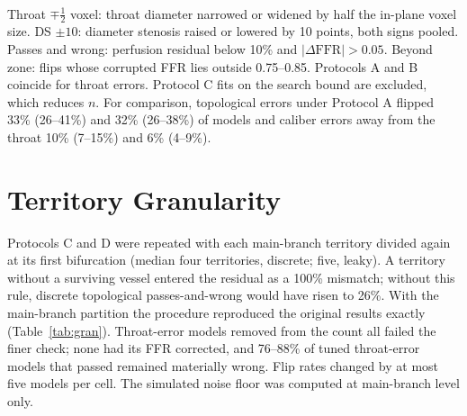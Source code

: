 \documentclass[journal,twoside,web,onecolumn]{ieeecolor}
\begin{document}
\begin{table}[!ht]
\\[3pt]
\parbox{0.95\textwidth}{\footnotesize Throat $\mp\tfrac12$ voxel: throat diameter narrowed or widened by half the in-plane voxel size. DS $\pm10$: diameter stenosis raised or lowered by 10 points, both signs pooled. Passes and wrong: perfusion residual below 10\% and $|\Delta\mathrm{FFR}| > 0.05$. Beyond zone: flips whose corrupted FFR lies outside 0.75--0.85. Protocols A and B coincide for throat errors. Protocol C fits on the search bound are excluded, which reduces $n$. For comparison, topological errors under Protocol A flipped 33\% (26--41\%) and 32\% (26--38\%) of models and caliber errors away from the throat 10\% (7--15\%) and 6\% (4--9\%).}
\end{table}

\FloatBarrier
{}
\section{Territory Granularity}\label{sec:granularity}
Protocols C and D were repeated with each main-branch territory divided again at its first bifurcation (median four territories, discrete; five, leaky). A territory without a surviving vessel entered the residual as a 100\% mismatch; without this rule, discrete topological passes-and-wrong would have risen to 26\%. With the main-branch partition the
procedure reproduced the original results exactly (Table~\ref{tab:gran}). Throat-error models removed from the count
all failed the finer check; none had its FFR corrected, and 76--88\% of tuned throat-error models that passed remained
materially wrong. Flip rates changed by at most five models per cell. The simulated noise floor was computed at
main-branch level only.
\end{document}
